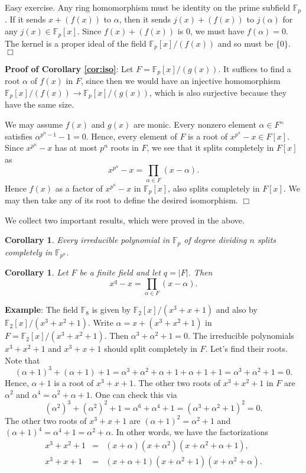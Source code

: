 \documentclass{article}
\def\F{{\mathbb F}}
\def\F{{\mathbb F}}
\def\v{{\vspace{5pt}}}
\newtheorem{cor}[subsection]{Corollary}
\newenvironment{proof}{\noindent {\bf Proof:}}{$\Box$ \vspace{2 ex}}
\begin{document}
\begin{proof}
    Easy exercise. Any ring homomorphism must be identity on the prime subfield $\F_p$. If it sends $x + (f(x))$ to $\alpha$, then it sends $j(x) + (f(x))$ to $j(\alpha)$ for any $j(x)\in\F_p[x]$. Since $f(x) + (f(x))$ is $0$, we must have $f(\alpha) = 0$. The kernel is a proper ideal of the field $\F_p[x]/(f(x))$ and so must be $\{0\}$.
\end{proof}

\noindent\textbf{Proof of Corollary \ref{cor:iso}}:
    Let $F = \F_p[x]/(g(x))$. It suffices to find a root $\alpha$ of $f(x)$ in $F$, since then we would have an injective homomorphism $\F_p[x]/(f(x))\rightarrow \F_p[x]/(g(x))$, which is also surjective because they have the same size. 

    We may assume $f(x)$ and $g(x)$ are monic. Every nonzero element $\alpha\in F^\times$ satisfies $\alpha^{p^n-1} - 1 =0$. Hence, every element of $F$ is a root of $x^{p^n}-x\in F[x]$. Since $x^{p^n}-x$ has at most $p^n$ roots in $F$, we see that it splits completely in $F[x]$ as $$x^{p^n} - x = \prod_{\alpha\in F}(x - \alpha).$$
    Hence $f(x)$ as a factor of $x^{p^n} - x$ in $\F_p[x]$, also splits completely in $F[x]$. We may then take any of its root to define the desired isomorphism. $\Box$

\v
We collect two important results, which were proved in the above.

\begin{cor}\label{cor:splits}
    Every irreducible polynomial in $\F_p$ of degree dividing $n$ splits completely in $\F_{p^n}$.
\end{cor}

\begin{cor}
    Let $F$ be a finite field and let $q = |F|$. Then $$x^{q} - x = \prod_{\alpha\in F}(x - \alpha).$$
\end{cor}

\vspace{5pt}
\noindent\textbf{Example}: The field $\F_8$ is given by $\F_2[x]/(x^3 + x + 1)$ and also by $\F_2[x]/(x^3 + x^2 + 1)$. Write $\alpha = x + (x^3 + x^2 + 1)$ in $F = \F_2[x]/(x^3 + x^2 + 1)$. Then $\alpha^3 + \alpha^2 + 1 = 0$. The irreducible polynomials $x^3 + x^2 + 1$ and $x^3 + x + 1$ should split completely in $F$. Let's find their roots.
  Note that
$$(\alpha+1)^3 + (\alpha+1) + 1 = \alpha^3 + \alpha^2 + \alpha + 1 + \alpha + 1 + 1 = \alpha^3 + \alpha^2 + 1 = 0.$$
Hence, $\alpha+1$ is a root of $x^3 + x + 1$. The other two roots of $x^3 + x^2 + 1$ in $F$ are $\alpha^2$ and $\alpha^4 = \alpha^2 + \alpha + 1$. One can check this via
$$(\alpha^2)^3 + (\alpha^2)^2 + 1 = \alpha^6 + \alpha^4 + 1 = (\alpha^3 + \alpha^2 + 1)^2 = 0.$$
The other two roots of $x^3 + x + 1$ are $(\alpha+1)^2 = \alpha^2 + 1$ and $(\alpha+1)^4 = \alpha^4 + 1 = \alpha^2 + \alpha$. In other words, we have the factorizations
\begin{eqnarray*}
    x^3 + x^2 + 1 &=& (x + \alpha)(x + \alpha^2)(x + \alpha^2 + \alpha + 1),\\
    x^3 + x + 1 &=& (x + \alpha + 1)(x + \alpha^2 + 1)(x + \alpha^2 + \alpha).
\end{eqnarray*}
\end{document}
